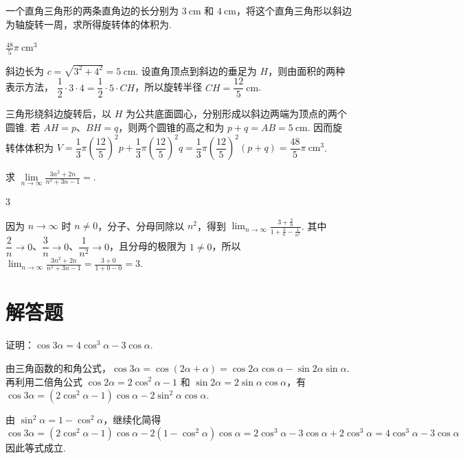 \documentclass[UTF8,a4paper,oneside,11pt]{ctexbook}
\begin{document}
\begin{problem}
一个直角三角形的两条直角边的长分别为 \(3\mathrm{~cm}\) 和 \(4\mathrm{~cm}\)，将这个直角三角形以斜边为轴旋转一周，求所得旋转体的体积为\fillinblank{}.
\end{problem}

\begin{answer}
\(\frac{48}{5}\pi\mathrm{~cm}^3\)
\end{answer}

\begin{solution}
斜边长为
\(c=\sqrt{3^2+4^2}=5\mathrm{~cm}\). 设直角顶点到斜边的垂足为 \(H\)，则由面积的两种表示方法，
\(\dfrac12\cdot3\cdot4=\dfrac12\cdot5\cdot CH\)，所以旋转半径
\(CH=\dfrac{12}{5}\mathrm{~cm}\).

三角形绕斜边旋转后，以 \(H\) 为公共底面圆心，分别形成以斜边两端为顶点的两个圆锥. 若 \(AH=p\)、\(BH=q\)，则两个圆锥的高之和为 \(p+q=AB=5\mathrm{~cm}\). 因而旋转体体积为
\(V=\dfrac13\pi\left(\dfrac{12}{5}\right)^2p+\dfrac13\pi\left(\dfrac{12}{5}\right)^2q=\dfrac13\pi\left(\dfrac{12}{5}\right)^2\left(p+q\right)=\dfrac{48}{5}\pi\mathrm{~cm}^3\).
\end{solution}

\begin{problem}
求 \(\displaystyle\lim\limits_{n\to\infty}\frac{3n^2 + 2n}{n^2 + 3n - 1}=\)\fillinblank{}.
\end{problem}

\begin{answer}
\(3\)
\end{answer}

\begin{solution}
因为 \(n\to\infty\) 时 \(n\ne0\)，分子、分母同除以 \(n^2\)，得到
\(\displaystyle\lim_{n\to\infty}\frac{3+\frac2n}{1+\frac3n-\frac1{n^2}}\). 其中 \(\dfrac2n\to0\)、\(\dfrac3n\to0\)、\(\dfrac1{n^2}\to0\)，且分母的极限为 \(1\ne0\)，所以
\(\displaystyle\lim_{n\to\infty}\frac{3n^2+2n}{n^2+3n-1}=\frac{3+0}{1+0-0}=3\).
\end{solution}

\section{解答题}

\begin{problem}
证明：\(\cos 3\alpha = 4\cos^3\alpha - 3\cos\alpha\).
\end{problem}

\begin{solution}
由三角函数的和角公式，\(\cos3\alpha=\cos(2\alpha+\alpha)=\cos2\alpha\cos\alpha-\sin2\alpha\sin\alpha\). 再利用二倍角公式 \(\cos2\alpha=2\cos^2\alpha-1\) 和 \(\sin2\alpha=2\sin\alpha\cos\alpha\)，有
\(\cos3\alpha=(2\cos^2\alpha-1)\cos\alpha-2\sin^2\alpha\cos\alpha\).

由 \(\sin^2\alpha=1-\cos^2\alpha\)，继续化简得
\[
\cos3\alpha=(2\cos^2\alpha-1)\cos\alpha-2(1-\cos^2\alpha)\cos\alpha=2\cos^3\alpha-3\cos\alpha+2\cos^3\alpha=4\cos^3\alpha-3\cos\alpha
\]
因此等式成立.
\end{solution}
\end{document}
